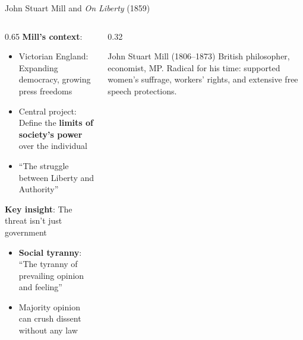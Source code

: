 ﻿\documentclass[aspectratio=169]{beamer}
\begin{document}
\begin{frame}{John Stuart Mill and \textit{On Liberty} (1859)}
\begin{columns}[T]
\begin{column}{0.65\textwidth}
\textbf{Mill's context}:
\begin{itemize}
    \item Victorian England: Expanding democracy, growing press freedoms
    \item Central project: Define the \textbf{limits of society's power} over the individual
    \item ``The struggle between Liberty and Authority''
\end{itemize}

\vspace{0.3cm}
\textbf{Key insight}: The threat isn't just government
\begin{itemize}
    \item \textbf{Social tyranny}: ``The tyranny of prevailing opinion and feeling''
    \item Majority opinion can crush dissent without any law
\end{itemize}
\end{column}

\begin{column}{0.32\textwidth}
\begin{block}{John Stuart Mill (1806--1873)}
\small
British philosopher, economist, MP. Radical for his time: supported women's suffrage, workers' rights, and extensive free speech protections.
\end{block}
\end{column}
\end{columns}
\end{frame}
\end{document}
